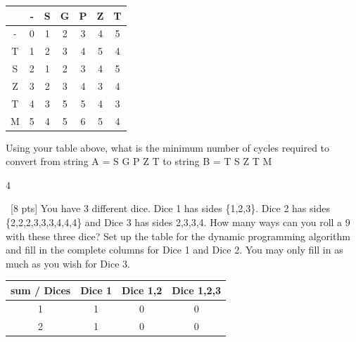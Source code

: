 \documentclass[12pt]{article}
\newenvironment{sol}[1][Solution]{\begin{trivlist}\item[\hskip\labelsep {\bfseries #1:}]}{\end{trivlist}}
\begin{document}
\begin{enumerate}
\begin{enumerate}
                    \begin{sol}
        \hspace*{\fill}
        \begin{center}
            \begin{tabular}{|c|c|c|c|c|c|c|}
            \hline
                  &- & S & G & P & Z & T  \\
                  \hline
                 - &0 & 1& 2 & 3 & 4 & 5\\
                 \hline
                T & 1 & 2& 3 & 4 & 5 & 4 \\
                \hline
                S & 2 & 1&2 &3   & 4  & 5\\
                \hline
                Z &  3 &2&3 &4  & 3  & 4 \\
                \hline
                T &  4 &3 &5& 5 & 4  &3 \\
                \hline
                M &  5 &4 &5& 6  & 5  &4 \\
                \hline
            \end{tabular}
        \end{center}
        \end{sol}
            \item[(d)] Using your table above, what is the minimum number of cycles required to convert from string A = S G P Z T to string B = T S Z T M
            \begin{sol}
            4
            \end{sol}
        \end{enumerate}
    \item \ [8 pts] You have 3 different dice. Dice 1 has sides \{1,2,3\}. Dice 2 has sides \{2,2,2,3,3,3,4,4,4\} and Dice 3 has sides {2,3,3,4}. How many ways can you roll a 9 with these three dice? Set up the table for the dynamic programming algorithm and fill in the complete columns for Dice 1 and Dice 2. You may only fill in as much as you wish for Dice 3.
    \begin{sol}\hspace*{\fill}
        \begin{center}
            \begin{tabular}{|c|c|c|c|}
                \hline
                 sum / Dices & Dice 1 & Dice 1,2 & Dice 1,2,3 \\
                 \hline
                                1 & 1& 0& 0 \\ 
                 \hline
                                2&1 & 0&  0\\ 

\end{tabular}
\end{center}
\end{sol}
\end{enumerate}
\end{document}
